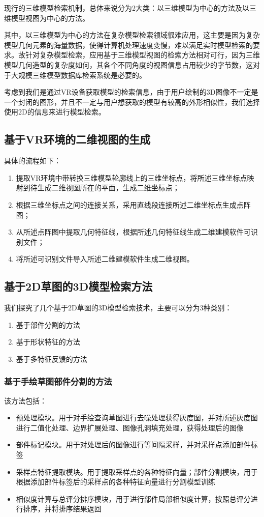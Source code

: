 \documentclass{article}
\begin{document}
现行的三维模型检索机制，总体来说分为2大类：以三维模型为中心的方法及以三维模型视图为中心的方法。

其中，以三维模型为中心的方法在复杂模型检索领域很难应用，这主要是因为复杂模型几何元素的海量数据，使得计算机处理速度变慢，难以满足实时模型检索的要求。故针对复杂模型检索，应用基于三维模型视图的检索方法相对可行，因为三维模型几何造型的复杂度如何，其各个不同角度的视图信息占用较少的字节数，这对于大规模三维模型数据库检索系统是必要的。

考虑到我们是通过VR设备获取模型的检索信息，由于用户绘制的3D图像不一定是一个封闭的图形，并且不一定与用户想获取的模型有较高的外形相似性，我们选择使用2D的信息来进行模型检索。
\subsection{基于VR环境的二维视图的生成}
具体的流程如下：
\begin{enumerate}
    \item 提取VR环境中带转换三维模型轮廓线上的三维坐标点，将所述三维坐标点映射到待生成二维视图所在的平面，生成二维坐标点；
    \item 根据三维坐标点之间的连接关系，采用直线段连接所述二维坐标点生成点阵图；
    \item 从所述点阵图中提取几何特征线，根据所述几何特征线生成二维建模软件可识别文件；
    \item 将所述可识别文件导入所述二维建模软件生成二维视图。
\end{enumerate}

\subsection{基于2D草图的3D模型检索方法}
我们探究了几个基于2D草图的3D模型检索技术，主要可以分为3种类别：
\begin{enumerate}
    \item 基于部件分割的方法
    \item 基于形状特征的方法
    \item 基于多特征反馈的方法
\end{enumerate}
\subsubsection{基于手绘草图部件分割的方法}
该方法包括：
\begin{itemize}
    \item 预处理模块。用于对手绘查询草图进行去噪处理获得灰度图，并对所述灰度图进行二值化处理、边界扩展处理、图像孔洞填充处理，获得处理后的图像
    \item 部件标记模块。用于对处理后的图像进行等间隔采样，并对采样点添加部件标签
    \item 采样点特征提取模块。用于提取采样点的各种特征向量；部件分割模块，用于根据添加部件标签后的采样点的各种特征向量进行分割模型训练
    \item 相似度计算与总评分排序模块，用于进行部件局部相似度计算，按照总评分进行排序，并将排序结果返回
\end{itemize}
\end{document}
